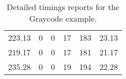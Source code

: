 \begin{table}[h]
{\begin{tabular}{cccccc}
            223.13             & 0                          & 0                          & 17                         & 183                        & 23.13                  \\
            219.17             & 0                          & 0                          & 17                         & 181                        & 21.17                  \\
            235.28             & 0                          & 0                          & 19                         & 194                        & 22.28                  \\
            \bottomrule
        \end{tabular}
    }
    \caption{Detailed timings reports for the Graycode example.}
\end{table}




